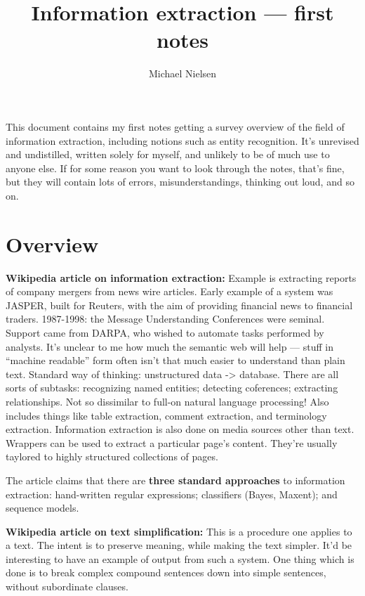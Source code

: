 
\title{Information extraction --- first notes}
\author{Michael Nielsen}



\maketitle

This document contains my first notes getting a survey overview of the
field of information extraction, including notions such as entity
recognition.  It's unrevised and undistilled, written solely for
myself, and unlikely to be of much use to anyone else.  If for some
reason you want to look through the notes, that's fine, but they will
contain lots of errors, misunderstandings, thinking out loud, and so
on.

\section{Overview}

\textbf{Wikipedia article on information extraction:} Example is
extracting reports of company mergers from news wire articles.  Early
example of a system was JASPER, built for Reuters, with the aim of
providing financial news to financial traders.  1987-1998: the Message
Understanding Conferences were seminal.  Support came from DARPA, who
wished to automate tasks performed by analysts.  It's unclear to me
how much the semantic web will help --- stuff in ``machine readable''
form often isn't that much easier to understand than plain text.
Standard way of thinking: unstructured data -> database.  There are
all sorts of subtasks: recognizing named entities; detecting
coferences; extracting relationships.  Not so dissimilar to full-on
natural language processing! Also includes things like table
extraction, comment extraction, and terminology extraction.
Information extraction is also done on media sources other than text.
Wrappers can be used to extract a particular page's content.  They're
usually taylored to highly structured collections of pages.

The article claims that there are \textbf{three standard approaches}
to information extraction: hand-written regular expressions;
classifiers (Bayes, Maxent); and sequence models.

\textbf{Wikipedia article on text simplification:} This is a procedure
one applies to a text.  The intent is to preserve meaning, while
making the text simpler.  It'd be interesting to have an example of
output from such a system.  One thing which is done is to break
complex compound sentences down into simple sentences, without
subordinate clauses.

